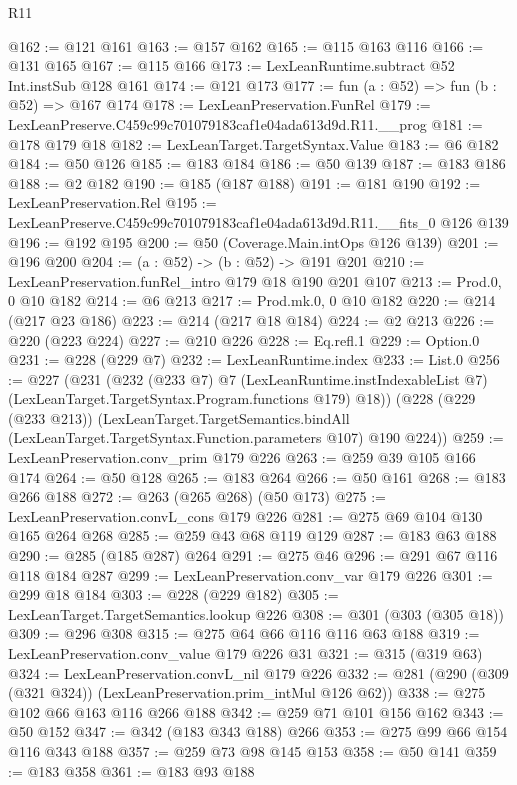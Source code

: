 \begin{lexlean}{R11}
\begin{coremodule}
@162 := @121 @161
@163 := @157 @162
@165 := @115 @163 @116
@166 := @131 @165
@167 := @115 @166
@173 := LexLeanRuntime.subtract @52 Int.instSub @128 @161
@174 := @121 @173
@177 := fun (a : @52) => fun (b : @52) => @167 @174
@178 := LexLeanPreservation.FunRel
@179 := LexLeanPreserve.C459c99c701079183caf1e04ada613d9d.R11.__prog
@181 := @178 @179 @18
@182 := LexLeanTarget.TargetSyntax.Value
@183 := @6 @182
@184 := @50 @126
@185 := @183 @184
@186 := @50 @139
@187 := @183 @186
@188 := @2 @182
@190 := @185 (@187 @188)
@191 := @181 @190
@192 := LexLeanPreservation.Rel
@195 := LexLeanPreserve.C459c99c701079183caf1e04ada613d9d.R11.__fits_0 @126 @139
@196 := @192 @195
@200 := @50 (Coverage.Main.intOps @126 @139)
@201 := @196 @200
@204 := (a : @52) -> (b : @52) -> @191 @201
@210 := LexLeanPreservation.funRel_intro @179 @18 @190 @201 @107
@213 := Prod.{0, 0} @10 @182
@214 := @6 @213
@217 := Prod.mk.{0, 0} @10 @182
@220 := @214 (@217 @23 @186)
@223 := @214 (@217 @18 @184)
@224 := @2 @213
@226 := @220 (@223 @224)
@227 := @210 @226
@228 := Eq.refl.{1}
@229 := Option.{0}
@231 := @228 (@229 @7)
@232 := LexLeanRuntime.index
@233 := List.{0}
@256 := @227
    (@231
      (@232
        (@233 @7)
        @7
        (LexLeanRuntime.instIndexableList @7)
        (LexLeanTarget.TargetSyntax.Program.functions @179)
        @18))
    (@228
      (@229 (@233 @213))
      (LexLeanTarget.TargetSemantics.bindAll
        (LexLeanTarget.TargetSyntax.Function.parameters @107)
        @190
        @224))
@259 := LexLeanPreservation.conv_prim @179 @226
@263 := @259 @39 @105 @166 @174
@264 := @50 @128
@265 := @183 @264
@266 := @50 @161
@268 := @183 @266 @188
@272 := @263 (@265 @268) (@50 @173)
@275 := LexLeanPreservation.convL_cons @179 @226
@281 := @275 @69 @104 @130 @165 @264 @268
@285 := @259 @43 @68 @119 @129
@287 := @183 @63 @188
@290 := @285 (@185 @287) @264
@291 := @275 @46
@296 := @291 @67 @116 @118 @184 @287
@299 := LexLeanPreservation.conv_var @179 @226
@301 := @299 @18 @184
@303 := @228 (@229 @182)
@305 := LexLeanTarget.TargetSemantics.lookup @226
@308 := @301 (@303 (@305 @18))
@309 := @296 @308
@315 := @275 @64 @66 @116 @116 @63 @188
@319 := LexLeanPreservation.conv_value @179 @226 @31
@321 := @315 (@319 @63)
@324 := LexLeanPreservation.convL_nil @179 @226
@332 := @281 (@290 (@309 (@321 @324)) (LexLeanPreservation.prim_intMul @126 @62))
@338 := @275 @102 @66 @163 @116 @266 @188
@342 := @259 @71 @101 @156 @162
@343 := @50 @152
@347 := @342 (@183 @343 @188) @266
@353 := @275 @99 @66 @154 @116 @343 @188
@357 := @259 @73 @98 @145 @153
@358 := @50 @141
@359 := @183 @358
@361 := @183 @93 @188

\end{coremodule}
\end{lexlean}
